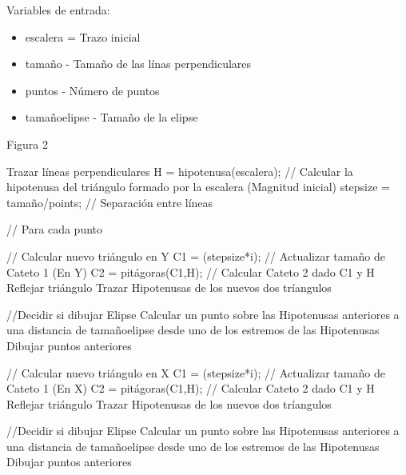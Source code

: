\documentclass[letter,10pt]{article}
\begin{document}
 

Variables de entrada:
\begin{itemize}
	\item  escalera = Trazo inicial
	\item  tamaño - Tamaño de las línas perpendiculares
	\item  puntos - Número de puntos
	\item tamañoelipse - Tamaño de la elipse
\end{itemize}

\begin{algorithm}
	\caption{Figura 2} 
	\begin{algorithmic}[1]

		\State Trazar líneas perpendiculares
		\State H = hipotenusa(escalera); // Calcular la hipotenusa del triángulo formado por la escalera (Magnitud inicial)
		\State stepsize = tamaño/points; // Separación entre líneas

		 // Para cada punto

			\State // Calcular nuevo triángulo en Y
			\State  C1 = (stepsize*i);   // Actualizar tamaño de Cateto 1 (En Y)
			\State  C2 = pitágoras(C1,H); // Calcular Cateto 2 dado C1 y H
			\State  Reflejar triángulo
			\State 	Trazar Hipotenusas de los nuevos dos tríangulos
			
			 //Decidir si dibujar Elipse
				\State Calcular un punto sobre las Hipotenusas anteriores a una distancia de tamañoelipse desde uno de los estremos de las Hipotenusas
				\State Dibujar puntos anteriores
			\EndIf

			\State // Calcular nuevo triángulo en X
			\State  C1 = (stepsize*i);   // Actualizar tamaño de Cateto 1 (En X)
			\State  C2 = pitágoras(C1,H); // Calcular Cateto 2 dado C1 y H
			\State  Reflejar triángulo
			\State 	Trazar Hipotenusas de los nuevos dos tríangulos
			
			 //Decidir si dibujar Elipse
				\State Calcular un punto sobre las Hipotenusas anteriores a una distancia de tamañoelipse desde uno de los estremos de las Hipotenusas
				\State Dibujar puntos anteriores
			\EndIf
		\EndFor
	\end{algorithmic} 
\end{algorithm}
\end{document}
